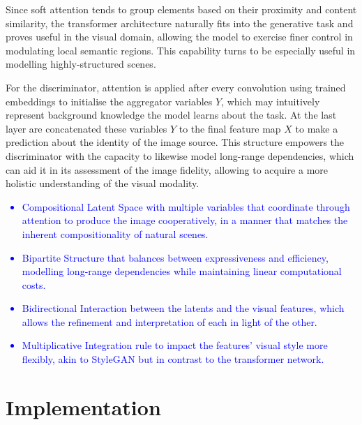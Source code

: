 \documentclass{article}
\begin{document}
	Since soft attention tends to group elements based on their proximity and content similarity, the 
	transformer architecture naturally fits into the generative task and proves useful in the visual 
	domain, allowing the model to exercise finer control in modulating local semantic regions. This 
	capability turns to be especially useful in modelling highly-structured scenes.
	
	For the discriminator, attention is applied after every convolution using trained embeddings to 
	initialise the aggregator variables $Y$, which may intuitively represent background knowledge the 
	model learns about the task. At the last layer are concatenated these variables $Y$ to the final 
	feature map $X$ to make a prediction about the identity of the image source. 
	This structure empowers the discriminator with the capacity to likewise model long-range 
	dependencies, which can aid it in its assessment of the image fidelity, allowing to acquire a more 
	holistic understanding of the visual modality.
	\textcolor{blue}{
	\begin{itemize}
		\item Compositional Latent Space with multiple variables that coordinate through attention to 
		produce the image cooperatively, in a manner that matches the inherent compositionality of 
		natural scenes.
		\item Bipartite Structure that balances between expressiveness and efficiency, modelling 
		long-range dependencies while maintaining linear computational costs.
		\item Bidirectional Interaction between the latents and the visual features, which allows the 
		refinement and interpretation of each in light of the other.
		\item Multiplicative Integration rule to impact the features' visual style more flexibly, akin to 
		StyleGAN but in contrast to the transformer network.
	\end{itemize}
}
	
	\section{Implementation}
	
\end{document}
